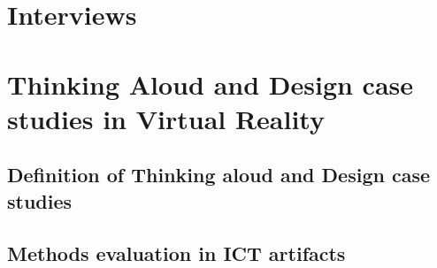 \section{Interviews}
\section{Thinking Aloud and Design case studies in Virtual Reality}
\subsection{Definition of Thinking aloud and Design case studies}
\subsection{Methods evaluation in ICT artifacts}


